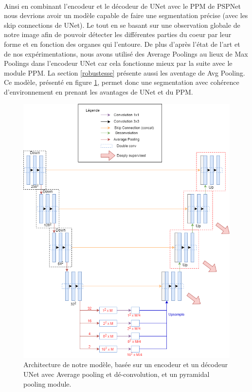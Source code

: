 \documentclass[french, english]{article}
\begin{document}
\paragraph{}Ainsi en combinant l'encodeur et le décodeur de UNet avec le PPM de PSPNet nous devrions avoir un modèle capable de faire une segmentation précise (avec les skip connections de UNet).
Le tout en se basant sur une observation globale de notre image afin de pouvoir détecter les différentes parties du coeur par leur forme et en fonction des organes qui l'entoure.
De plus d'après l'état de l'art et de nos expérimentations, nous avons utilisé des Average Poolings au lieux de Max Poolings dans l'encodeur UNet car cela fonctionne mieux par la suite avec le module PPM. La section \ref{robustesse} présente aussi les aventage de Avg Pooling.
Ce modèle, présenté en figure \ref{model},  permet donc une segmentation avec cohérence d'environnement en prenant les avantages de UNet et du PPM.

\begin{figure}[!t]
    \centering
    \includegraphics[scale=0.45]{img/SubUnetAvecPPM.png}
    \caption{Architecture de notre modèle, basée sur un encodeur et un décodeur UNet avec Average pooling et dé-convolution, et un pyramidal pooling module.}
    \label{model}
\end{figure}
\end{document}

